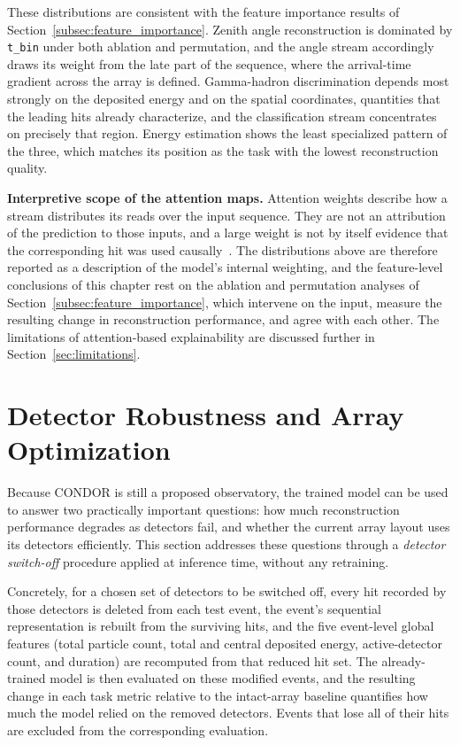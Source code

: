 These distributions are consistent with the feature importance results of Section~\ref{subsec:feature_importance}. Zenith angle reconstruction is dominated by \texttt{t\_bin} under both ablation and permutation, and the angle stream accordingly draws its weight from the late part of the sequence, where the arrival-time gradient across the array is defined. Gamma-hadron discrimination depends most strongly on the deposited energy and on the spatial coordinates, quantities that the leading hits already characterize, and the classification stream concentrates on precisely that region. Energy estimation shows the least specialized pattern of the three, which matches its position as the task with the lowest reconstruction quality.

\textbf{Interpretive scope of the attention maps.} Attention weights describe how a stream distributes its reads over the input sequence. They are not an attribution of the prediction to those inputs, and a large weight is not by itself evidence that the corresponding hit was used causally~. The distributions above are therefore reported as a description of the model's internal weighting, and the feature-level conclusions of this chapter rest on the ablation and permutation analyses of Section~\ref{subsec:feature_importance}, which intervene on the input, measure the resulting change in reconstruction performance, and agree with each other. The limitations of attention-based explainability are discussed further in Section~\ref{sec:limitations}.

\section{Detector Robustness and Array Optimization}
\label{sec:robustness}

Because CONDOR is still a proposed observatory, the trained model can be used to answer two practically important questions: how much reconstruction performance degrades as detectors fail, and whether the current array layout uses its detectors efficiently. This section addresses these questions through a \textit{detector switch-off} procedure applied at inference time, without any retraining. 

Concretely, for a chosen set of detectors to be switched off, every hit recorded by those detectors is deleted from each test event, the event's sequential representation is rebuilt from the surviving hits, and the five event-level global features (total particle count, total and central deposited energy, active-detector count, and duration) are recomputed from that reduced hit set. The already-trained model is then evaluated on these modified events, and the resulting change in each task metric relative to the intact-array baseline quantifies how much the model relied on the removed detectors. Events that lose all of their hits are excluded from the corresponding evaluation.

